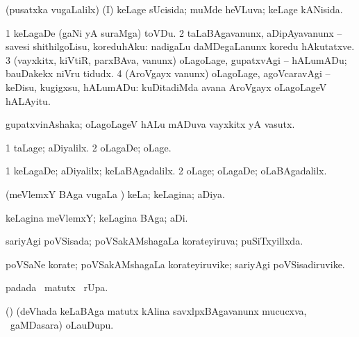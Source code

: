 {\bentry
{} 
\gl{\gu}
\expl{}
\bmng
(pusatxka \mo vugaLalilx) (I) keLage sUcisida; muMde heVLuva; keLage kANisida. 
\emng
\eentry

\bentry
{} 
\gl{\sakirx}
\expl{}
\bmng
\bnum
\num{1} keLagaDe (gaNi yA suraMga) toVDu. 
\num{2} taLaBAgavanunx, aDipAyavanunx -- savesi shithilgoLisu, koreduhAku:  nadigaLu daMDegaLanunx koredu hAkutatxve. 
\num{3} (vayxkitx, kiVtiR, parxBAva, \mo vanunx) oLagoLage, gupatxvAgi -- hALumADu; bauDakekx niVru tidudx. 
\num{4} (AroVgayx \mo vanunx) oLagoLage, agoVcaravAgi -- keDisu, kugigxsu, hALumADu:  kuDitadiMda avana AroVgayx oLagoLageV hALAyitu. 
\enum
\emng
\eentry

\bentry
{} 
\gl{\nA}
\expl{}
\bmng
 gupatxvinAshaka; oLagoLageV hALu mADuva vayxkitx yA vasutx. 
\emng
\eentry

\bentry
{} 
\gl{\kirxvi}
\expl{}
\bmng
\bnum
\num{1} taLage; aDiyalilx. 
\num{2} oLagaDe; oLage. 
\enum
\emng
\eentry

\bentry
{} 
\gl{\upa}
\bmng
\bnum
\num{1} keLagaDe; aDiyalilx; keLaBAgadalilx. 
\num{2} oLage; oLagaDe; oLaBAgadalilx. 
\enum
\emng
\eentry

\bentry
{} 
\gl{\gu}
\expl{}
\bmng
 (meVlemxY BAga \mo vugaLa \vi) keLa; keLagina; aDiya. 
\emng
\eentry

\bentry
{} 
\gl{\nA}
\expl{}
\bmng
 keLagina meVlemxY; keLagina BAga; aDi. 
\emng
\eentry

\bentry
{} 
\gl{\gu}
\expl{}
\bmng
 sariyAgi poVSisada; poVSakAMshagaLa korateyiruva; puSiTxyillxda. 
\emng
\eentry

\bentry
{} 
\gl{\nA}
\expl{}
\bmng
 poVSaNe korate; poVSakAMshagaLa korateyiruvike; sariyAgi poVSisadiruvike. 
\emng
\eentry

\bentry
{} 
\gl{\kirx}
\expl{}
\bmng
  padada \BU\ matutx \BUkaq\ rUpa. 
\emng
\eentry

\bentry
{} 
\gl{\nA}
\expl{}
\bmng
 (\bava) (deVhada keLaBAga matutx kAlina savxlpxBAgavanunx mucucxva, \kanmu\ gaMDasara) oLauDupu. 
\emng
\eentry

}
